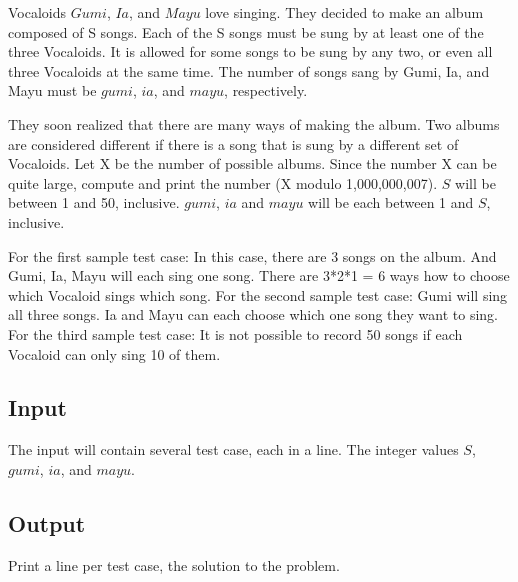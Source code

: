 Vocaloids $Gumi$, $Ia$, and $Mayu$ love singing. They decided to make an album composed of S songs. Each of the S songs must be sung by at least one of the three Vocaloids. It is allowed for some songs to be sung by any two, or even all three Vocaloids at the same time. The number of songs sang by Gumi, Ia, and Mayu must be $gumi$, $ia$, and $mayu$, respectively. 

They soon realized that there are many ways of making the album. Two albums are considered different if there is a song that is sung by a different set of Vocaloids. Let X be the number of possible albums. Since the number X can be quite large, compute and print the number (X modulo 1,000,000,007). $S$ will be between 1 and 50, inclusive. $gumi$, $ia$ and $mayu$ will be each between 1 and $S$, inclusive.

For the first sample test case:  In this case, there are 3 songs on the album. And Gumi, Ia, Mayu will each sing one song. There are 3*2*1 = 6 ways how to choose which Vocaloid sings which song. For the second sample test case: Gumi will sing all three songs. Ia and Mayu can each choose which one song they want to sing. For the third sample test case:
It is not possible to record 50 songs if each Vocaloid can only sing 10 of them.


\subsection* {Input}

The input will contain several test case, each in a line. The integer values $S$, $gumi$, $ia$, and $mayu$.

\subsection* {Output}

Print a line per test case, the solution to the problem.

\outputnotice

